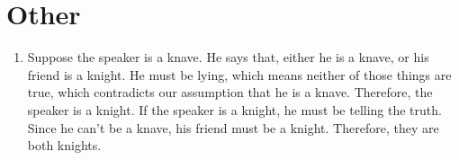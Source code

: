 \documentclass{article}
\begin{document}
\section{Other}
\begin{enumerate}
	\item
		Suppose the speaker is a knave. He says that, either he is a knave, or his friend is a knight. He must be lying, which means neither of those things are true, which contradicts our assumption that he is a knave. Therefore, the speaker is a knight. If the speaker is a knight, he must be telling the truth. Since he can't be a knave, his friend must be a knight. Therefore, they are both knights.
\end{enumerate}
\end{document}

